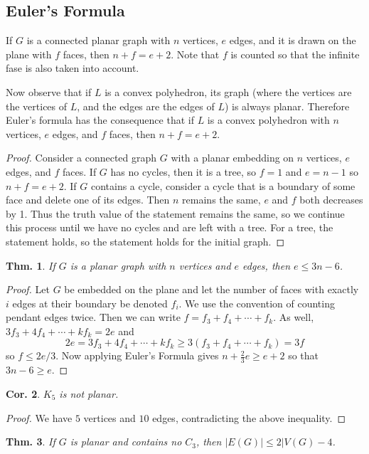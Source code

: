 \documentclass[12pt, a4paper]{book}
\newtheorem{theorem}{Thm.}[section]
\newtheorem{corollary}[theorem]{Cor.}
\theoremstyle{nonumberplain}
\newtheorem{proof}{Proof}
\begin{document}
\subsection{Euler's Formula}
If $G$ is a connected planar graph with $n$ vertices, $e$ edges, and it is drawn on the plane with $f$ faces, then $n+f=e+2$.
Note that $f$ is counted so that the infinite fase is also taken into account.

Now observe that if $L$ is a convex polyhedron, its graph (where the vertices are the vertices of $L$, and the edges are the edges of $L$) is always planar.
Therefore Euler's formula has the consequence that if $L$ is a convex polyhedron with $n$ vertices, $e$ edges, and $f$ faces, then $n+f=e+2$.
\begin{proof}
    Consider a connected graph $G$ with a planar embedding on $n$ vertices, $e$ edges, and $f$ faces.
    If $G$ has no cycles, then it is a tree, so $f=1$ and $e=n-1$ so $n+f=e+2$.
    If $G$ contains a cycle, consider a cycle that is a boundary of some face and delete one of its edges.
    Then $n$ remains the same, $e$ and $f$ both decreases by 1.
    Thus the truth value of the statement remains the same, so we continue this process until we have no cycles and are left with a tree.
    For a tree, the statement holds, so the statement holds for the initial graph.
\end{proof}
\begin{theorem}
    If $G$ is a planar graph with $n$ vertices and $e$ edges, then $e\leq 3n-6$.
\end{theorem}
\begin{proof}
    Let $G$ be embedded on the plane and let the number of faces with exactly $i$ edges at their boundary be denoted $f_i$.
    We use the convention of counting pendant edges twice.
    Then we can write $f=f_3+f_4+\cdots+f_k$.
    As well, $3f_3+4f_4+\cdots+kf_k=2e$ and
    \begin{equation*}
        2e = 3f_3+4f_4+\cdots+kf_k\geq 3(f_3+f_4+\cdots+f_k)=3f
    \end{equation*}
    so $f\leq 2e/3$.
    Now applying Euler's Formula gives $n+\frac{2}{3}e\geq e+2$ so that $3n-6\geq e$.
\end{proof}
\begin{corollary}
    $K_5$ is not planar.
\end{corollary}
\begin{proof}
    We have $5$ vertices and $10$ edges, contradicting the above inequality.
\end{proof}
\begin{theorem}
    If $G$ is planar and contains no $C_3$, then $|E(G)|\leq 2|V(G)-4$.
\end{theorem}
\end{document}
